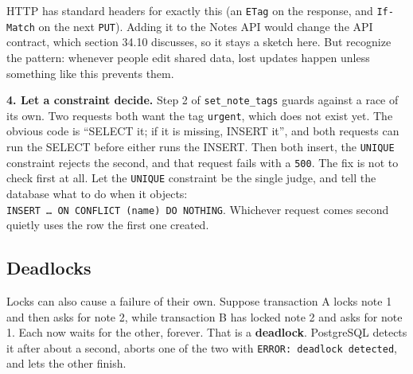 \begin{codebox}[short]

\begin{Shaded}
\begin{Highlighting}[]
\OperatorTok{=}\OperatorTok{=}\OperatorTok{+} 
  \OperatorTok{=}\OperatorTok{=}
\end{Highlighting}
\end{Shaded}

\end{codebox}

\noindent{}HTTP has standard headers for exactly this (an \texttt{ETag} on the response, and \texttt{If-Match} on the next \texttt{PUT}). Adding it to the Notes API would change the API contract, which section 34.10 discusses, so it stays a sketch here. But recognize the pattern: whenever people edit shared data, lost updates happen unless something like this prevents them.

\textbf{4. Let a constraint decide.} Step 2 of \texttt{set\_note\_tags} guards against a race of its own. Two requests both want the tag \texttt{urgent}, which does not exist yet. The obvious code is ``SELECT it; if it is missing, INSERT it'', and both requests can run the SELECT before either runs the INSERT. Then both insert, the \texttt{UNIQUE} constraint rejects the second, and that request fails with a \texttt{500}. The fix is not to check first at all. Let the \texttt{UNIQUE} constraint be the single judge, and tell the database what to do when it objects: \texttt{INSERT\ …\ ON\ CONFLICT\ (name)\ DO\ NOTHING}. Whichever request comes second quietly uses the row the first one created.

\subsection*{Deadlocks}\label{33-logic-execution:deadlocks}

Locks can also cause a failure of their own. Suppose transaction A locks note 1 and then asks for note 2, while transaction B has locked note 2 and asks for note 1. Each now waits for the other, forever. That is a \textbf{deadlock}. PostgreSQL detects it after about a second, aborts one of the two with \texttt{ERROR:}\allowbreak{}\texttt{\ deadlock\ detected}, and lets the other finish.

